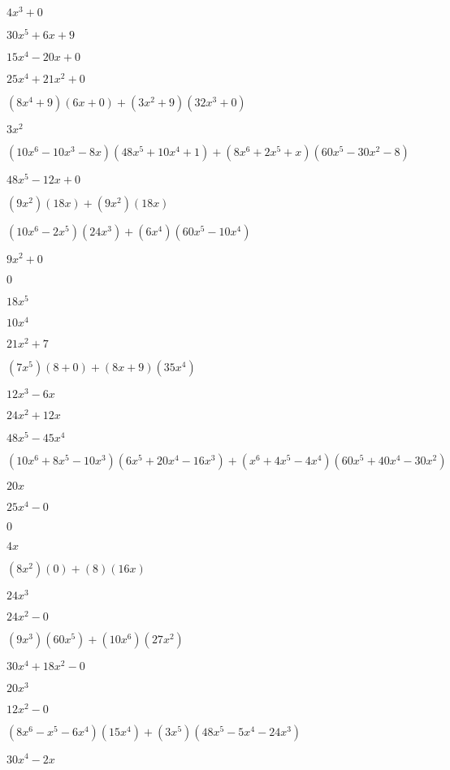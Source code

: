 \documentclass{article}
\begin{document}
\begin{multicols}{2}
$4x^{3}+0$\item $30x^{5}+6x+9$\item $15x^{4}-20x+0$\item $25x^{4}+21x^{2}+0$\item $(8x^{4}+9)(6x+0)+(3x^2+9)(32x^{3}+0)$\item $3x^{2}$\item $(10x^{6}-10x^{3}-8x)(48x^{5}+10x^{4}+1)+(8x^{6}+2x^{5}+x)(60x^{5}-30x^{2}-8)$\item $48x^{5}-12x+0$\item $(9x^2)(18x)+(9x^2)(18x)$\item $(10x^{6}-2x^{5})(24x^{3})+(6x^{4})(60x^{5}-10x^{4})$\item $9x^{2}+0$\item $0$\item $18x^{5}$\item $10x^{4}$\item $21x^{2}+7$\item $(7x^{5})(8+0)+(8x+9)(35x^{4})$\item $12x^{3}-6x$\item $24x^{2}+12x$\item $48x^{5}-45x^{4}$\item $(10x^{6}+8x^{5}-10x^{3})(6x^{5}+20x^{4}-16x^{3})+(x^{6}+4x^{5}-4x^{4})(60x^{5}+40x^{4}-30x^{2})$\item $20x$\item $25x^{4}-0$\item $0$\item $4x$\item $(8x^2)(0)+(8)(16x)$\item $24x^{3}$\item $24x^{2}-0$\item $(9x^{3})(60x^{5})+(10x^{6})(27x^{2})$\item $30x^{4}+18x^{2}-0$\item $20x^{3}$\item $12x^{2}-0$\item $(8x^{6}-x^{5}-6x^{4})(15x^{4})+(3x^{5})(48x^{5}-5x^{4}-24x^{3})$\item $30x^{4}-2x$\item 
\end{multicols}
\end{document}
